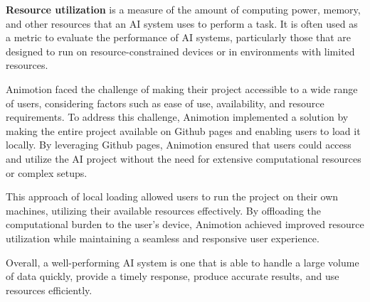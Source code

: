 \textbf{Resource utilization} is a measure of the amount of computing power, memory, and other 
resources that an AI system uses to perform a task.
It is often used as a metric to evaluate the performance of AI systems, particularly those that 
are designed to run on resource-constrained devices or in environments with limited resources.

Animotion faced the challenge of making their project accessible to a wide range of users, 
considering factors such as ease of use, availability, and resource requirements.
To address this challenge, Animotion implemented a solution by making the entire project 
available on Github pages and enabling users to load it locally. By leveraging Github pages, 
Animotion ensured that users could access and utilize the AI project without the need for 
extensive computational resources or complex setups.

This approach of local loading allowed users to run the project on their own machines, 
utilizing their available resources effectively. By offloading the computational burden to 
the user's device, Animotion achieved improved resource utilization while maintaining a 
seamless and responsive user experience.

Overall, a well-performing AI system is one that is able to handle a 
large volume of data quickly, provide a timely response, produce accurate 
results, and use resources efficiently.